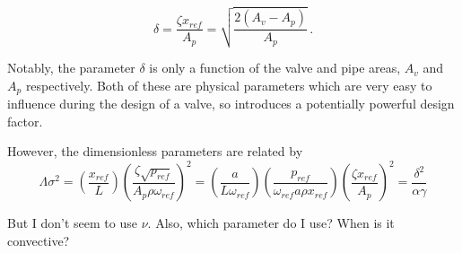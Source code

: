 \begin{equation*}
    \delta = \frac{\zeta x_{ref}}{A_p} = \sqrt{\frac{2 \left( A_v - A_p \right)}{A_p}} \, .
\end{equation*}

Notably, the parameter $\delta$ is only a function of the valve and pipe areas, $A_v$ and $A_p$ respectively. Both of these are physical parameters which are very easy to influence during the design of a valve, so introduces a potentially powerful design factor.

However, the dimensionless parameters are related by
~
\begin{equation*}
    \Lambda \sigma^2 = \left( \frac{x_{ref}}{L} \right) \left( \frac{\zeta \sqrt{p_{ref}}}{A_p \rho \omega_{ref}} \right)^2 = \left( \frac{a}{L \omega_{ref}} \right) \left( \frac{p_{ref}}{\omega_{ref} a \rho x_{ref}} \right) \left( \frac{\zeta x_{ref}}{A_p} \right)^2 = \frac{\delta^2}{\alpha \gamma}
\end{equation*}

But I don't seem to use $\nu$. Also, which parameter do I use? When is it convective?



